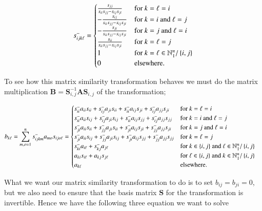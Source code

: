 \documentclass[11pt,english,a4paper]{article}
\begin{document}
\begin{flushleft}
\begin{align*}
s_{ijk\ell}^- = \begin{cases} \frac{s_{jj}}{s_{ii}s_{jj}-s_{ij}s_{ji}} & \text{for $k=\ell=i$} \\ -\frac{s_{ij}}{s_{ii}s_{jj}-s_{ij}s_{ji}} & \text{for $k=i$ and $\ell=j$} \\ -\frac{s_{ji}}{s_{ii}s_{jj}-s_{ij}s_{ji}} & \text{for $k=j$ and $\ell=i$} \\ \frac{s_{ii}}{s_{ii}s_{jj}-s_{ij}s_{ji}} & \text{for $k=\ell=j$} \\ 1 & \text{for $k=\ell\in\mathbb{N}_1^n/\left\lbrace{i,j}\right\rbrace$} \\ 0 & \text{elsewhere.} \end{cases}
\end{align*}

To see how this matrix similarity transformation behaves we must do the matrix multiplication $\mathbf{B} = \mathbf{S}_{i,j}^{-1} \mathbf{A}\mathbf{S}_{i,j}$ of the transformation;

\begin{align}
b_{k\ell} &= \sum_{m,o=1}^n s_{ijkm}^- a_{mo} s_{ijo\ell} = \begin{cases} s_{ii}^- a_{ii} s_{ii} + s_{ij}^- a_{ji} s_{ii} + s_{ii}^- a_{ij} s_{ji} + s_{ij}^- a_{jj} s_{ji} & \text{for $k=\ell=i$} \\ s_{ii}^- a_{ii} s_{ij} + s_{ij}^- a_{ji} s_{ij} + s_{ii}^- a_{ij} s_{jj} + s_{ij}^- a_{jj} s_{jj} & \text{for $k=i$ and $\ell = j$} \\ s_{ji}^- a_{ii} s_{ii} + s_{jj}^- a_{ji} s_{ii} + s_{ji}^- a_{ij} s_{ji} + s_{jj}^- a_{jj} s_{ji} & \text{for $k=j$ and $\ell=i$} \\ s_{ji}^- a_{ii} s_{ij} + s_{jj}^- a_{ji} s_{ij} + s_{ji}^- a_{ij} s_{jj} + s_{jj}^- a_{jj} s_{jj} & \text{for $k=\ell=j$} \\ s_{ki}^- a_{i \ell} + s_{kj}^- a_{j\ell} & \text{for $k\in\left\lbrace{i,j}\right\rbrace$ and $\ell\in\mathbb{N}_1^n / \left\lbrace{i,j}\right\rbrace$} \\ a_{ki} s_{i\ell} + a_{kj}s_{j\ell} & \text{for $\ell\in\left\lbrace{i,j}\right\rbrace$ and $k\in\mathbb{N}_1^n / \left\lbrace{i,j}\right\rbrace$} \\ a_{k\ell} & \text{elsewhere.}\end{cases}
\label{eq_9}
\end{align}

What we want our matrix similarity transformation to do is to set $b_{ij} = b_{ji} = 0$, but we also need to ensure that the basis matrix $\mathbf{S}$ for the transformation is invertible. Hence we have the following three equation we want to solve 


\end{flushleft}
\end{document}
